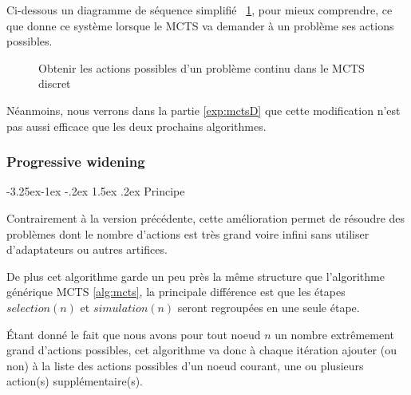 \documentclass[pdftex,french, english]{article}	%
\makeatletter
\newcounter {subsubsubsection}[subsubsection]
\newcommand\subsubsubsection{\@startsection{subsubsubsection}{4}{\z@}%
                                     {-3.25ex\@plus -1ex \@minus -.2ex}%
                                     {1.5ex \@plus .2ex}%
                                     {\normalfont\normalsize\bfseries}}
\makeatother
\begin{document}
		Ci-dessous un diagramme de séquence simplifié ~\ref{fig:actionsPossibles}, pour mieux comprendre, ce que donne ce système lorsque le MCTS va demander à un problème ses actions possibles.
		\begin{figure}[H]
			\centering
			\caption{Obtenir les actions possibles d'un problème continu dans le MCTS discret} \label{fig:actionsPossibles}
		\end{figure}

		Néanmoins, nous verrons dans la partie \ref{exp:mctsD} que cette modification n'est pas aussi efficace que les deux prochains algorithmes.
	\subsubsection{Progressive widening}

		\subsubsubsection{Principe}

		Contrairement à la version précédente, cette amélioration permet de résoudre des problèmes dont le nombre d'actions est très grand voire infini sans utiliser d'adaptateurs ou autres artifices.

		De plus cet algorithme garde un peu près la même structure que l'algorithme générique MCTS \ref{alg:mcts}, la principale différence est que les étapes $selection(n)$ et $simulation(n)$ seront regroupées en une seule étape.

		Étant donné le fait que nous avons pour tout noeud $n$ un nombre extrêmement grand d'actions possibles, cet algorithme va donc à chaque itération ajouter (ou non) à la liste des actions possibles d'un noeud courant, une ou plusieurs action(s) supplémentaire(s).
\end{document}
